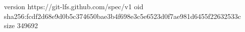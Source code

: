 version https://git-lfs.github.com/spec/v1
oid sha256:fcdf2d68e9d0b5c374650bae3b4f698e3c5e6523d0f7ae981d6455f22632533c
size 349692
